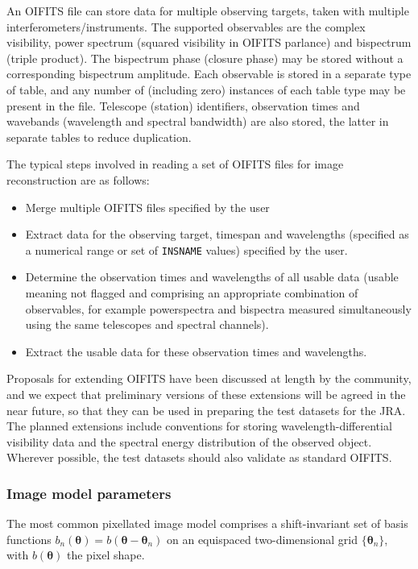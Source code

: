 \documentclass{article}
\newcommand{\V}[1]{\boldsymbol{#1}}      %
\newcommand{\Dirn}{\theta}            %
\newcommand{\VDirn}{\V{\Dirn}}
\newcommand{\BasisFunc}{b}
\newcommand{\OIFITS}{OIFITS\xspace} %
\begin{document}
An \OIFITS file can store data for multiple observing targets, taken with
multiple interferometers/instruments. The supported observables are the
complex visibility, power spectrum (squared visibility in \OIFITS parlance)
and bispectrum (triple product). The bispectrum phase (closure phase) may be
stored without a corresponding bispectrum amplitude. Each observable is stored
in a separate type of table, and any number of (including zero) instances of
each table type may be present in the file. Telescope (station) identifiers,
observation times and wavebands (wavelength and spectral bandwidth) are also
stored, the latter in separate tables to reduce duplication.

The typical steps involved in reading a set of \OIFITS files for image
reconstruction are as follows:
\begin{itemize}
\item Merge multiple \OIFITS files specified by the user

\item Extract data for the observing target, timespan and wavelengths
  (specified as a numerical range or set of \verb+INSNAME+ values) specified
  by the user.

\item Determine the observation times and wavelengths of all usable data
  (usable meaning not flagged and comprising an appropriate combination of
  observables, for example powerspectra and bispectra measured simultaneously
  using the same telescopes and spectral channels).

\item Extract the usable data for these observation times and wavelengths.
\end{itemize}

Proposals for extending \OIFITS have been discussed at length by the
community, and we expect that preliminary versions of these extensions will be
agreed in the near future, so that they can be used in preparing the test
datasets for the JRA. The planned extensions include conventions for storing
wavelength-differential visibility data and the spectral energy distribution
of the observed object. Wherever possible, the test datasets should also
validate as standard OIFITS.

\subsubsection{Image model parameters}

The most common pixellated image model comprises a shift-invariant set of
basis functions $\BasisFunc_n(\VDirn) = \BasisFunc(\VDirn - \VDirn_n)$ on an
equispaced two-dimensional grid $\{\VDirn_n\}$, with $\BasisFunc(\VDirn)$ the
pixel shape.
\end{document}

